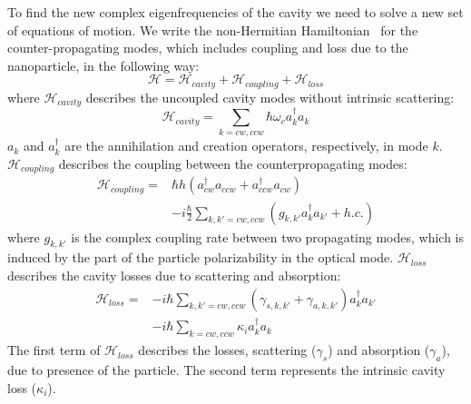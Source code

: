 \documentclass[journal=jacsat,manuscript=article]{achemso}
\begin{document}
To find the new complex eigenfrequencies of the cavity we need to solve a new set of equations of motion. We write the non-Hermitian Hamiltonian~\cite{yi2011multiple} for the counter-propagating modes, which includes coupling and loss due to the nanoparticle, in the following way:
\begin{equation}
\mathcal{H} = \mathcal{H}_{cavity} + \mathcal{H}_{coupling} + \mathcal{H}_{loss}
\end{equation}
where $\mathcal{H}_{cavity}$ describes the uncoupled cavity modes without intrinsic scattering:
\begin{equation}
\mathcal{H}_{cavity} = \sum_{k=cw,ccw} \hbar \omega_c a_{k}^{\dagger} a_{k} 
\end{equation}
$a_{k}$ and $a_{k}^{\dagger}$ are the annihilation and creation operators, respectively, in mode $k$. $\mathcal{H}_{coupling}$ describes the coupling between the counterpropagating modes:
\begin{equation}
\begin{split}
\mathcal{H}_{coupling} = &\hbar h \left( a_{cw}^{\dagger} a_{ccw} + a_{ccw}^{\dagger} a_{cw} \right) \\
&- i \frac{\hbar}{2} \sum_{k,k'=cw,ccw} \left( g_{k,k'} a_{k}^{\dagger} a_{k'} + h.c. \right)
\end{split}
\end{equation}
where $g_{k,k'}$ is the complex coupling rate between two propagating modes, which is induced by the part of the particle polarizability in the optical mode. $\mathcal{H}_{loss}$ describes the cavity losses due to scattering and absorption:
\begin{equation}
\begin{split}
\mathcal{H}_{loss} = &- i \hbar \sum_{k,k'=cw,ccw} \left( \gamma_{s,k,k'} + \gamma_{a,k,k'} \right) a_{k}^{\dagger} a_{k'} \\
&- i \hbar \sum_{k=cw,ccw} \kappa_i a_{k}^{\dagger} a_{k}
\end{split}
\end{equation}
The first term of $\mathcal{H}_{loss}$ describes the losses, scattering ($\gamma_s$) and absorption ($\gamma_a$), due to presence of the particle. The second term represents the intrinsic cavity loss ($\kappa_i$).
\end{document}
